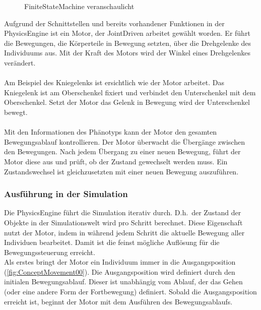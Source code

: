       \begin{figure}[H]
        \centering
        
        \caption{\Gls{FiniteStateMachine} veranschaulicht\label{fig:ConceptEngineFSM}}
      \end{figure}

      Aufgrund der Schnittstellen und bereits vorhandener Funktionen in der \gls{PhysicsEngine} ist ein Motor,
      der \gls{JointDriven} arbeitet gewählt worden.
      Er führt die Bewegungen, die Körperteile in Bewegung setzten, über die Drehgelenke des Individuums aus.
      Mit der Kraft des Motors wird der Winkel eines Drehgelenkes verändert.
      \\
      \\
      Am Beispiel des Kniegelenks ist ersichtlich wie der Motor arbeitet.
      Das Kniegelenk ist am Oberschenkel fixiert und verbindet den Unterschenkel mit dem Oberschenkel.
      Setzt der Motor das Gelenk in Bewegung wird der Unterschenkel bewegt.
      \\
      \\
      Mit den Informationen des Phänotyps kann der Motor den gesamten Bewegungsablauf kontrollieren.
      Der Motor überwacht die Übergänge zwischen den Bewegungen.
      Nach jedem Übergang zu einer neuen Bewegung, führt der Motor diese aus und prüft,
      ob der Zustand gewechselt werden muss.
      Ein Zustandswechsel ist gleichzusetzten mit einer neuen Bewegung auszuführen.

      \subsubsection{Ausführung in der Simulation}

        Die \gls{PhysicsEngine} führt die Simulation iterativ durch.
        D.h.\ der Zustand der Objekte in der Simulationswelt wird pro Schritt berechnet.
        Diese Eigenschaft nutzt der Motor,
        indem in während jedem Schritt die aktuelle Bewegung aller Individuen bearbeitet.
        Damit ist die feinst mögliche Auflösung für die Bewegungssteuerung erreicht.
        \\
        Als erstes bringt der Motor ein Individuum immer in die Ausgangsposition (\vref{fig:ConceptMovement00}).
        Die Ausgangsposition wird definiert durch den initialen Bewegungsablauf.
        Dieser ist unabhängig vom Ablauf, der das Gehen (oder eine andere Form der Fortbewegung) definiert.
        Sobald die Ausgangsposition erreicht ist, beginnt der Motor mit dem Ausführen des Bewegungsablaufs.

